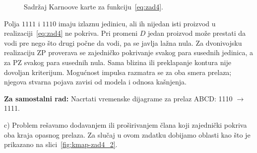 \documentclass[a4paper,11pt]{article}
\numberwithin{equation}{section} %
\begin{document}
\begin{figure}[!ht]
  \centering
  \captionsetup{skip=-8pt} %
  
  \caption{Sadržaj Karnoove karte za funkciju~\eqref{eq:zad4}.}
  \label{fig:kmap-zad4}
\end{figure}

Polja $1111$ i $1110$ imaju izlaznu jedinicu, ali ih nijedan isti proizvod
u realizaciji~\eqref{eq:zad4} ne pokriva. Pri promeni $D$ jedan proizvod može
prestati da vodi pre nego što drugi počne da vodi, pa se javlja lažna nula.
Za dvonivojsku realizaciju ZP proverava se zajedničko pokrivanje svakog para
susednih jedinica, a za PZ svakog para susednih nula. Sama blizina ili
preklapanje kontura nije dovoljan kriterijum. Mogućnost impulsa razmatra se
za oba smera prelaza; njegova stvarna pojava zavisi od modela i odnosa kašnjenja.

\begin{tcolorbox}[colback=gray!10, colframe=black, boxrule=0.5pt]
\textbf{Za samostalni rad:} Nacrtati vremenske dijagrame za prelaz ABCD: 1110 $\rightarrow$ 1111.
\end{tcolorbox}

\noindent\makebox[\linewidth]{\dotfill}

\noindent
c) Problem rešavamo dodavanjem ili proširivanjem člana koji zajednički pokriva oba kraja opasnog prelaza. Za slučaj u ovom zadatku
dobijamo oblasti kao što je prikazano na slici~\ref{fig:kmap-zad4_2}.
\end{document}
